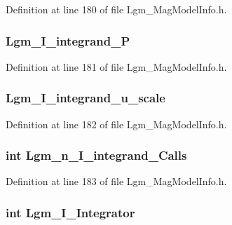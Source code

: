 Definition at line 180 of file Lgm\_\-MagModelInfo.h.\hypertarget{struct_lgm___mag_model_info_a3ad9c4b833001273b79b67cb2a86d49}{
\subsubsection[{Lgm\_\-I\_\-integrand\_\-P}]{ {\bf Lgm\_\-I\_\-integrand\_\-P}}}
\label{struct_lgm___mag_model_info_a3ad9c4b833001273b79b67cb2a86d49}




Definition at line 181 of file Lgm\_\-MagModelInfo.h.\hypertarget{struct_lgm___mag_model_info_e7d44a46b9d0110bafb9f5c47f1b047c}{
\subsubsection[{Lgm\_\-I\_\-integrand\_\-u\_\-scale}]{ {\bf Lgm\_\-I\_\-integrand\_\-u\_\-scale}}}
\label{struct_lgm___mag_model_info_e7d44a46b9d0110bafb9f5c47f1b047c}




Definition at line 182 of file Lgm\_\-MagModelInfo.h.\hypertarget{struct_lgm___mag_model_info_0b40445e52e091e26fb821e573c41ba0}{
\subsubsection[{Lgm\_\-n\_\-I\_\-integrand\_\-Calls}]{\setlength{\rightskip}{0pt plus 5cm}int {\bf Lgm\_\-n\_\-I\_\-integrand\_\-Calls}}}
\label{struct_lgm___mag_model_info_0b40445e52e091e26fb821e573c41ba0}




Definition at line 183 of file Lgm\_\-MagModelInfo.h.\hypertarget{struct_lgm___mag_model_info_22a0997163992fbc3d980522be2fd613}{
\subsubsection[{Lgm\_\-I\_\-Integrator}]{\setlength{\rightskip}{0pt plus 5cm}int {\bf Lgm\_\-I\_\-Integrator}}}
\label{struct_lgm___mag_model_info_22a0997163992fbc3d980522be2fd613}




